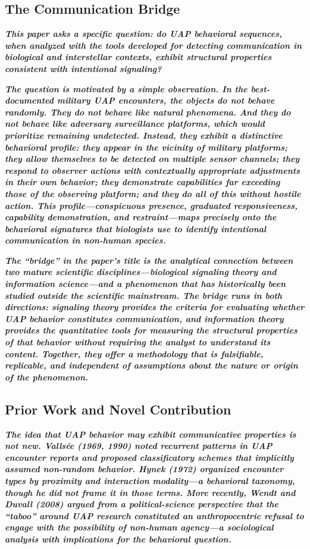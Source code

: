 \documentclass[11pt,letterpaper]{article}
\begin{document}
\subsection{The Communication Bridge}

\textbf{\textit{This paper asks a specific question: do UAP behavioral sequences, when analyzed with the tools developed for detecting communication in biological and interstellar contexts, exhibit structural properties consistent with intentional signaling?}}


\textbf{\textit{The question is motivated by a simple observation. In the best-documented military UAP encounters, the objects do not behave randomly. They do not behave like natural phenomena. And they do not behave like adversary surveillance platforms, which would prioritize remaining undetected. Instead, they exhibit a distinctive behavioral profile: they appear in the vicinity of military platforms; they allow themselves to be detected on multiple sensor channels; they respond to observer actions with contextually appropriate adjustments in their own behavior; they demonstrate capabilities far exceeding those of the observing platform; and they do all of this without hostile action. This profile---conspicuous presence, graduated responsiveness, capability demonstration, and restraint---maps precisely onto the behavioral signatures that biologists use to identify intentional communication in non-human species.}}


\textbf{\textit{The ``bridge'' in the paper's title is the analytical connection between two mature scientific disciplines---biological signaling theory and information science---and a phenomenon that has historically been studied outside the scientific mainstream. The bridge runs in both directions: signaling theory provides the criteria for evaluating whether UAP behavior constitutes communication, and information theory provides the quantitative tools for measuring the structural properties of that behavior without requiring the analyst to understand its content. Together, they offer a methodology that is falsifiable, replicable, and independent of assumptions about the nature or origin of the phenomenon.}}


\subsection{Prior Work and Novel Contribution}

\textbf{\textit{The idea that UAP behavior may exhibit communicative properties is not new. Valls\'ee (1969, 1990) noted recurrent patterns in UAP encounter reports and proposed classificatory schemes that implicitly assumed non-random behavior. Hynek (1972) organized encounter types by proximity and interaction modality---a behavioral taxonomy, though he did not frame it in those terms. More recently, Wendt and Duvall (2008) argued from a political-science perspective that the ``taboo'' around UAP research constituted an anthropocentric refusal to engage with the possibility of non-human agency---a sociological analysis with implications for the behavioral question.}}
\end{document}
